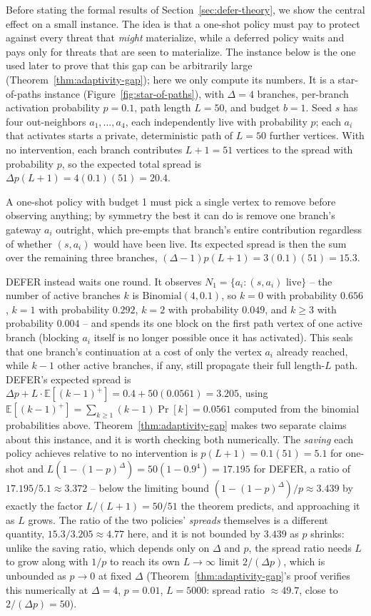 \documentclass[ASNA,number]{USG}
\begin{document}
Before stating the formal results of Section~\ref{sec:defer-theory}, we show
the central effect on a small instance. The idea is that a one-shot policy
must pay to protect against every threat that \emph{might} materialize,
while a deferred policy waits and pays only for threats that are seen to
materialize. The instance below is the one used later to prove that this gap
can be arbitrarily large (Theorem~\ref{thm:adaptivity-gap}); here we only
compute its numbers. It is a star-of-paths instance
(Figure~\ref{fig:star-of-paths}), with $\Delta=4$ branches,
per-branch activation probability $p=0.1$, path length $L=50$, and budget
$b=1$. Seed $s$ has four out-neighbors $a_1,\dots,a_4$, each independently
live with probability $p$; each $a_i$ that activates starts a private,
deterministic path of $L=50$ further vertices. With no intervention, each
branch contributes $L+1=51$ vertices to the spread with probability $p$,
so the expected total spread is $\Delta p(L+1)=4(0.1)(51)=20.4$.

A one-shot policy with budget 1 must pick a single vertex to remove before
observing anything; by symmetry the best it can do is remove one branch's
gateway $a_i$ outright, which pre-empts that branch's entire contribution
regardless of whether $(s,a_i)$ would have been live. Its expected spread
is then the sum over the remaining three branches,
$(\Delta-1)p(L+1)=3(0.1)(51)=15.3$.

DEFER instead waits one round. It observes $N_1=\{a_i:(s,a_i)\text{ live}\}$
-- the number of active branches $k$ is $\mathrm{Binomial}(4,0.1)$, so
$k=0$ with probability $0.656$, $k=1$ with probability $0.292$, $k=2$ with
probability $0.049$, and $k\ge3$ with probability $0.004$ -- and spends its
one block on the first path vertex of one active branch (blocking $a_i$
itself is no longer possible once it has activated). This seals that one
branch's continuation at a cost of only the vertex $a_i$ already reached,
while $k-1$ other active branches, if any, still propagate their full
length-$L$ path. DEFER's expected spread is
$\Delta p+L\cdot\mathbb E[(k-1)^+]=0.4+50(0.0561)=3.205$, using
$\mathbb E[(k-1)^+]=\sum_{k\ge1}(k-1)\Pr[k]=0.0561$ computed from the
binomial probabilities above. Theorem~\ref{thm:adaptivity-gap} makes two
separate claims about this instance, and it is worth checking both
numerically. The \emph{saving} each policy achieves relative to no
intervention is $p(L+1)=0.1(51)=5.1$ for one-shot and
$L(1-(1-p)^\Delta)=50(1-0.9^4)=17.195$ for DEFER, a ratio of
$17.195/5.1\approx3.372$ -- below the limiting bound
$(1-(1-p)^\Delta)/p\approx3.439$ by exactly the factor $L/(L+1)=50/51$ the
theorem predicts, and approaching it as $L$ grows. The ratio of the two
policies' \emph{spreads} themselves is a different quantity,
$15.3/3.205\approx4.77$ here, and it is not bounded by $3.439$ as $p$
shrinks: unlike the saving ratio, which depends only on $\Delta$ and $p$,
the spread ratio needs $L$ to grow along with $1/p$ to reach its own
$L\to\infty$ limit $2/(\Delta p)$, which is unbounded as $p\to0$ at fixed
$\Delta$ (Theorem~\ref{thm:adaptivity-gap}'s proof verifies this
numerically at $\Delta=4$, $p=0.01$, $L=5000$: spread ratio $\approx49.7$,
close to $2/(\Delta p)=50$).
\end{document}
